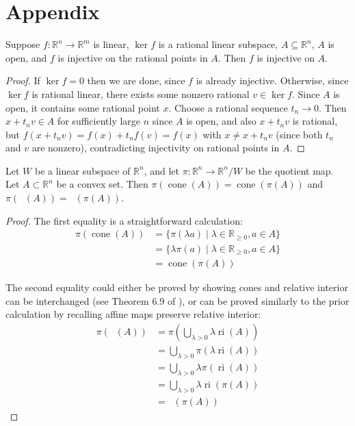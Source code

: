\documentclass[12pt]{article}
\newcommand{\R}{\mathbb{R}}
\DeclareMathOperator{\cone}{cone^\circ}
\DeclareMathOperator{\ccone}{cone}
\DeclareMathOperator{\relint}{ri}
\renewcommand{\ge}{\geqslant}
\theoremstyle{nonumberdefinition}
\theoremstyle{empty}
\theoremstyle{empty}
\begin{document}
\section{Appendix}
\begin{claim}\label{claim:injectivityResult}
 Suppose $f \colon \R^n \to \R^m$ is linear, $\ker f$ is a rational linear subspace, $A \subseteq \R^n$, $A$ is open, and $f$ is injective on the rational points in $A$. Then $f$ is injective on $A$.
\end{claim}
\begin{proof}
	If $\ker f = 0$ then we are done, since $f$ is already injective. Otherwise, since $\ker f$ is rational linear, there exists some nonzero rational $v \in \ker f$. Since $A$ is open, it contains some rational point $x$. Choose a rational sequence $t_n \to 0$. Then $x + t_n v \in A$ for sufficiently large $n$ since $A$ is open, and also $x + t_n v$ is rational, but $f(x+t_n v) = f(x) + t_n f(v) = f(x)$ with $x \neq x + t_n v$ (since both $t_n$ and $v$ are nonzero), contradicting injectivity on rational points in $A$. 
\end{proof}

\begin{claim}\label{claim:quotientsCommuteWithConvexCone}
	Let $W$ be a linear subspace of $\R^n$, and let $\pi \colon \R^n \to \R^n/W$ be the quotient map. Let $A \subset \R^n$ be a convex set. Then $\pi(\ccone(A)) = \ccone(\pi(A))$ and $\pi(\cone(A)) = \cone(\pi(A))$.
\end{claim}
\begin{proof}
	The first equality is a straightforward calculation:
	\begin{align*}
	\pi(\ccone(A)) &= \{\pi(\lambda a) \mid \lambda \in \R_{\ge 0}, a \in A \}
	\\&=\{\lambda \pi(a) \mid \lambda \in \R_{\ge 0}, a \in A \}
	\\&= \ccone(\pi(A))
	\end{align*}

	The second equality could either be proved by showing cones and relative interior can be interchanged (see Theorem 6.9 of \cite{rockafellarConvexAnalysis2015}), or can be proved similarly to the prior calculation by recalling affine maps preserve relative interior:
	\begin{align*}
	\pi(\cone(A)) &= \pi \left( \textstyle{\bigcup_{\lambda > 0}} \lambda \relint(A) \right)
	\\&=  \textstyle{\bigcup_{\lambda > 0}}  \pi \left(\lambda \relint(A) \right)
	\\&=  \textstyle{\bigcup_{\lambda > 0}}  \lambda \pi \left( \relint(A) \right)
	\\&=  \textstyle{\bigcup_{\lambda > 0}}  \lambda \relint \left( \pi(A) \right)
	\\&=\cone(\pi(A))
	\end{align*}
\end{proof}


\pagebreak

\end{document}
